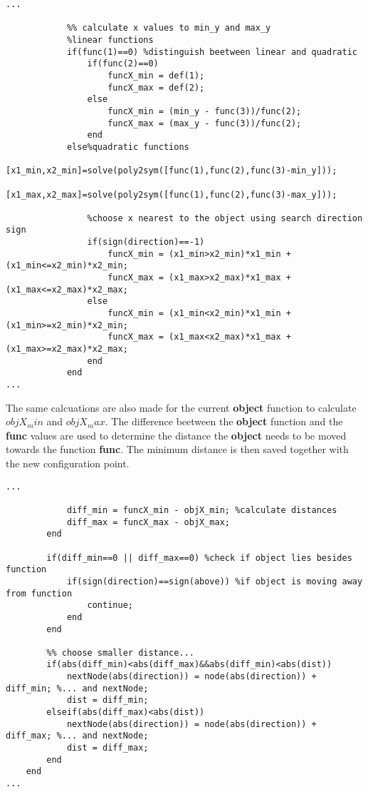 \begin{lstlisting}
...
            
            %% calculate x values to min_y and max_y
            %linear functions
            if(func(1)==0) %distinguish beetween linear and quadratic
                if(func(2)==0)
                    funcX_min = def(1);
                    funcX_max = def(2);
                else
                    funcX_min = (min_y - func(3))/func(2);
                    funcX_max = (max_y - func(3))/func(2);
                end
            else%quadratic functions
                [x1_min,x2_min]=solve(poly2sym([func(1),func(2),func(3)-min_y]));
                [x1_max,x2_max]=solve(poly2sym([func(1),func(2),func(3)-max_y]));
                
                %choose x nearest to the object using search direction sign
                if(sign(direction)==-1)
                    funcX_min = (x1_min>x2_min)*x1_min +(x1_min<=x2_min)*x2_min;
                    funcX_max = (x1_max>x2_max)*x1_max +(x1_max<=x2_max)*x2_max;
                else
                    funcX_min = (x1_min<x2_min)*x1_min +(x1_min>=x2_min)*x2_min;
                    funcX_max = (x1_max<x2_max)*x1_max +(x1_max>=x2_max)*x2_max;
                end
            end
...
\end{lstlisting}
The same calcuations are also made for the current \textbf{object} function to calculate $objX_min$ and $objX_max$. The difference beetween the \textbf{object} function and the \textbf{func} values are used to determine the distance the \textbf{object} needs to be moved towards the function \textbf{func}. The minimum distance is then saved together with the new configuration point.
\begin{lstlisting}
...           
            
            diff_min = funcX_min - objX_min; %calculate distances
            diff_max = funcX_max - objX_max;
        end
        
        if(diff_min==0 || diff_max==0) %check if object lies besides function
            if(sign(direction)==sign(above)) %if object is moving away from function
                continue;
            end
        end
        
        %% choose smaller distance...
        if(abs(diff_min)<abs(diff_max)&&abs(diff_min)<abs(dist))
            nextNode(abs(direction)) = node(abs(direction)) + diff_min; %... and nextNode;
            dist = diff_min;
        elseif(abs(diff_max)<abs(dist))
            nextNode(abs(direction)) = node(abs(direction)) + diff_max; %... and nextNode;
            dist = diff_max;
        end
    end
...
\end{lstlisting}
